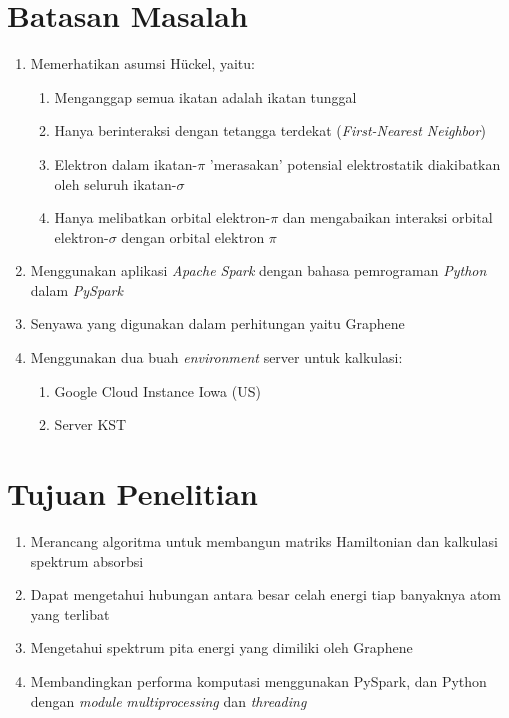 \documentclass[12pt,a4paper]{report}
\begin{document}
	\section{Batasan Masalah}
	\begin{enumerate}
		\item Memerhatikan asumsi Hückel, yaitu:
		\begin{enumerate}
			\item Menganggap semua ikatan adalah ikatan tunggal
			\item Hanya berinteraksi dengan tetangga terdekat (\textit{First-Nearest Neighbor})
			\item Elektron dalam ikatan-$\pi$ 'merasakan' potensial elektrostatik diakibatkan oleh seluruh ikatan-$\sigma$
			\item Hanya melibatkan orbital elektron-$\pi$ dan mengabaikan interaksi orbital elektron-$\sigma$ dengan orbital elektron $\pi$
		\end{enumerate}
		\item Menggunakan aplikasi \textit{Apache Spark} dengan bahasa pemrograman \textit{Python} dalam \textit{PySpark}
		\item Senyawa yang digunakan dalam perhitungan yaitu Graphene
		\item Menggunakan dua buah \textit{environment} server untuk kalkulasi:
		\begin{enumerate}
			\item Google Cloud Instance Iowa (US)
			\item Server KST
		\end{enumerate}
	\end{enumerate}

	\section{Tujuan Penelitian}
	\begin{enumerate}
		\item Merancang algoritma untuk membangun matriks Hamiltonian dan kalkulasi spektrum absorbsi
		\item Dapat mengetahui hubungan antara besar celah energi tiap banyaknya atom yang terlibat
		\item Mengetahui spektrum pita energi yang dimiliki oleh Graphene
		\item Membandingkan performa komputasi menggunakan PySpark, dan Python dengan \textit{module} \textit{multiprocessing} dan \textit{threading}
	\end{enumerate}
\end{document}
